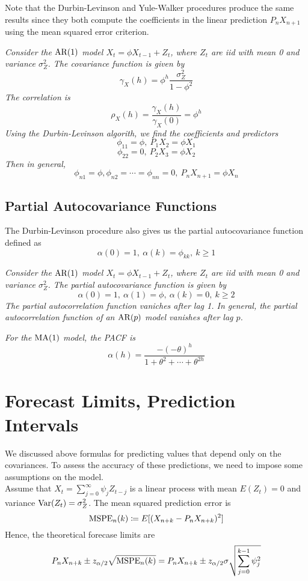 Note that the Durbin-Levinson and Yule-Walker procedures produce the same results since they both compute the coefficients in the linear prediction $P_nX_{n+1}$ using the mean squared error criterion.

\begin{example}
    \emph{
        Consider the $\operatorname{AR}(1)$ model $X_t = \phi X_{t-1} + Z_t$, where $Z_t$ are iid with mean 0 and variance $\sigma_Z^2$. The covariance function is given by 
        \[\gamma_X(h) = \phi^h\frac{\sigma_Z^2}{1-\phi^2}\]
        The correlation is 
        \[\rho_X(h) = \frac{\gamma_X(h)}{\gamma_X(0)} = \phi^h\]
        Using the Durbin-Levinson algorith, we find the coefficients and predictors
        \[\phi_{11} = \phi, \ P_1 X_2 = \phi X_1\]
        \[\phi_{22} = 0, \ P_2X_3 = \phi X_2\]
        Then in general, 
        \[\phi_{n1} = \phi, \phi_{n2} = \cdots = \phi_{nn} = 0, \ P_nX_{n+1} = \phi X_n\]
    }
\end{example}

\subsection{Partial Autocovariance Functions}

The Durbin-Levinson procedure also gives us the partial autocovariance function defined as 
\[\alpha(0) = 1, \ \alpha(k) = \phi_{kk}, \ k \geq 1\]

\begin{example}
    \emph{
        Consider the $\operatorname{AR}(1)$ model $X_t = \phi X_{t-1} + Z_t$, where $Z_t$ are iid with mean 0 and variance $\sigma_Z^2$. The partial autocovariance function is given by
        \[\alpha(0) = 1, \ \alpha(1) = \phi, \ \alpha(k) = 0, \ k \geq 2\]
        The partial autocorrelation function vaniches after lag 1. In general, the partial autocorrelation function of an $\operatorname{AR}(p)$ model vanishes after lag $p$.
    }
\end{example}

\begin{example}
    \emph{For the $\operatorname{MA}(1)$ model, the PACF is}
    \[\alpha(h) = \frac{-(-\theta)^h}{1+\theta^2+\cdots + \theta^{2h}}\]
\end{example}

\section{Forecast Limits, Prediction Intervals}

We discussed above formulas for predicting values that depend only on the covariances. To assess the accuracy of these predictions, we need to impose some assumptions on the model.\\

Assume that $X_t = \sum_{j=0}^\infty \psi_jZ_{t-j}$ is a linear process with mean $E(Z_t) = 0$ and variance $\operatorname{Var}(Z_t) = \sigma_Z^2$. The mean squared prediction error is
\[\operatorname{MSPE}_n(k) \coloneq E[(X_{n+k} - P_nX_{n+k})^2]\]
Hence, the theoretical forecase limits are 
\[P_nX_{n+k} \pm z_{\alpha/2}\sqrt{\operatorname{MSPE}_n(k)} = P_nX_{n+k} \pm z_{\alpha/2}\sigma\sqrt{\sum_{j=0}^{k-1}\psi_j^2}\]